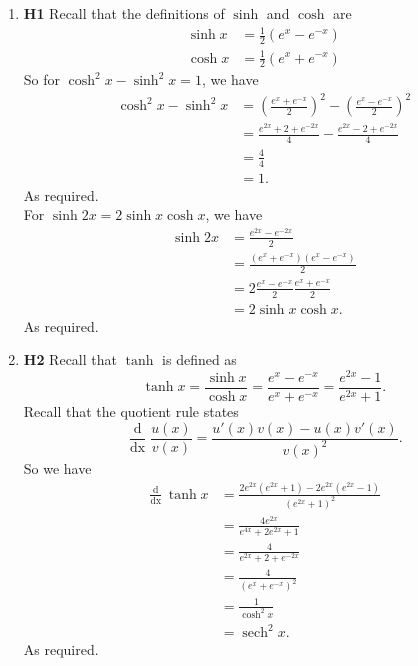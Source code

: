 \documentclass[12pt,oneside]{book}
\DeclareMathOperator{\sech}{sech}
\begin{document}
\begin{enumerate}
\begin{proof}
        \end{proof} 
        \item \textbf{H1} Recall that the definitions of $\sinh$ and $\cosh$ are \begin{align*}
            \sinh x &= \frac{1}{2}(e^x - e^{-x}) \\
            \cosh x &= \frac{1}{2}(e^x + e^{-x})
        \end{align*}
        So for $\cosh^2 x - \sinh^2 x = 1$, we have \begin{align*}
            \cosh^2 x - \sinh^2 x &= \left( \frac{e^x + e^{-x}}{2} \right)^2 - \left( \frac{e^x - e^{-x}}{2} \right)^2 \\
            &= \frac{e^{2x} + 2 + e^{-2x}}{4} - \frac{e^{2x} - 2 + e^{-2x}}{4} \\
            &= \frac{4}{4} \\
            &= 1.
        \end{align*}
        As required. \\
        For $\sinh 2x = 2 \sinh x \cosh x$, we have \begin{align*}
            \sinh 2x &= \frac{e^{2x} - e^{-2x}}{2} \\
            &= \frac{(e^x+e^{-x})(e^x-e^{-x})}{2} \\
            &= 2 \frac{e^x - e^{-x}}{2} \frac{e^x + e^{-x}}{2} \\
            &= 2 \sinh x \cosh x.
        \end{align*}
        As required.
        \item \textbf{H2} Recall that $\tanh$ is defined as \[
            \tanh x = \frac{\sinh x}{\cosh x} = \frac{e^x - e^{-x}}{e^x + e^{-x}} = \frac{e^{2x} - 1}{e^{2x} + 1} 
        .\] Recall that the quotient rule states \[
            \frac{\mathop{\mathrm{d}}}{\mathop{\mathrm{d}x}} \frac{u(x)}{v(x)} = \frac{u'(x) v(x) - u(x)v'(x)}{v(x)^2}
        .\] So we have \begin{align*}
            \frac{\mathop{\mathrm{d}}}{\mathop{\mathrm{d}x}} \tanh x &= \frac{2e^{2x}(e^{2x} + 1) - 2e^{2x}(e^{2x} - 1)}{(e^{2x} + 1)^2} \\
            &= \frac{4e^{2x}}{e^{4x} + 2e^{2x} + 1} \\
            &= \frac{4}{e^{2x} + 2 + e^{-2x}} \\
            &= \frac{4}{(e^x + e^{-x})^2} \\
            &= \frac{1}{\cosh^2 x} \\
            &= \sech^2 x.
        \end{align*}
        As required.
    \end{enumerate}
    
\end{document}
